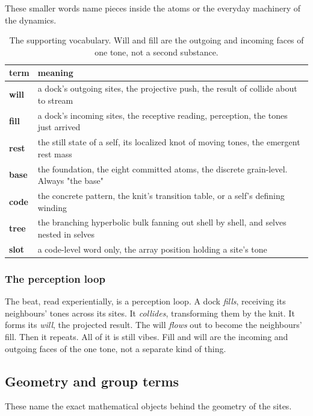 These smaller words name pieces inside the atoms or the everyday machinery of the dynamics.

\begin{table}[ht]
\centering
\begin{tabular}{@{}ll@{}}
\toprule
term & meaning \\
\midrule
\textbf{will} & a dock's outgoing sites, the projective push, the result of collide about to stream \\
\textbf{fill} & a dock's incoming sites, the receptive reading, perception, the tones just arrived \\
\textbf{rest} & the still state of a self, its localized knot of moving tones, the emergent rest mass \\
\textbf{base} & the foundation, the eight committed atoms, the discrete grain-level. Always "the base" \\
\textbf{code} & the concrete pattern, the knit's transition table, or a self's defining winding \\
\textbf{tree} & the branching hyperbolic bulk fanning out shell by shell, and selves nested in selves \\
\textbf{slot} & a code-level word only, the array position holding a site's tone \\
\bottomrule
\end{tabular}
\caption{The supporting vocabulary. Will and fill are the outgoing and incoming faces of one tone, not a second substance.}
\label{tab:supporting}
\end{table}

\subsubsection{The perception loop}

The beat, read experientially, is a perception loop. A dock \emph{fills}, receiving its neighbours' tones across its sites. It \emph{collides}, transforming them by the knit. It forms its \emph{will}, the projected result. The will \emph{flows} out to become the neighbours' fill. Then it repeats. All of it is still vibes. Fill and will are the incoming and outgoing faces of the one tone, not a separate kind of thing.

\subsection{Geometry and group terms}

These name the exact mathematical objects behind the geometry of the sites.

